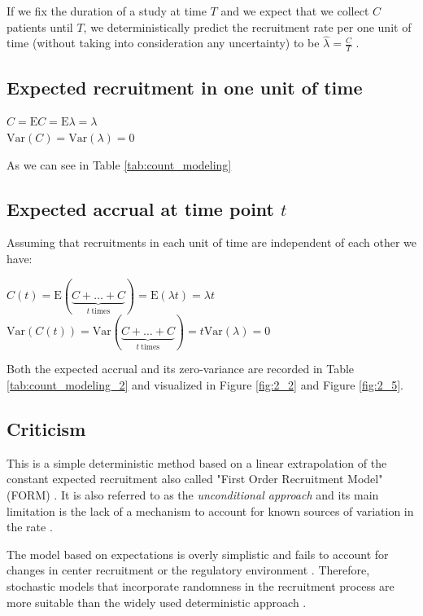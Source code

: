 If we fix the duration of a study at time $T$ and we expect that we collect $C$ patients until $T$, we deterministically predict the recruitment rate per one unit of time (without taking into consideration any uncertainty) to be $\hat{\lambda}=\frac{C}{T}$ \citep{carter2004application}.




\subsection{Expected recruitment in one unit of time}
$C = \textrm{E}C = \textrm{E}\lambda = \lambda$\\
$\textrm{Var}(C) = \textrm{Var}(\lambda) = 0$

As we can see in Table \ref{tab:count_modeling}

\subsection{Expected accrual at time point $t$}

Assuming that recruitments in each unit of time are independent of each other we have:

$C(t) = \textrm{E}(\underbrace{C+\ldots+C}_{t \ \text{times}}) = \textrm{E}(\lambda t) = \lambda t$\\
$\textrm{Var}(C(t)) = \textrm{Var}(\underbrace{C+\ldots+C}_{t \ \text{times}}) = t \textrm{Var}(\lambda) = 0$

Both the expected accrual and its zero-variance are recorded in Table \ref{tab:count_modeling_2}
and visualized in Figure \ref{fig:2_2} and Figure \ref{fig:2_5}.

\subsection{Criticism}

This is a simple deterministic method based on a linear extrapolation of the constant expected recruitment also called "First Order Recruitment Model" (FORM) \citep{comfort2013}. It is also referred to as the \textit{unconditional approach} and its main limitation is the lack of a mechanism to account for known sources of variation in the rate \citep{carter2005practical}. 

The model based on expectations is overly simplistic and fails to account for changes in center recruitment or the regulatory environment \citep{barnard2010systematic}. Therefore, stochastic models that incorporate randomness in the recruitment process are more suitable than the widely used deterministic approach \citep{zhang2012modeling}.

